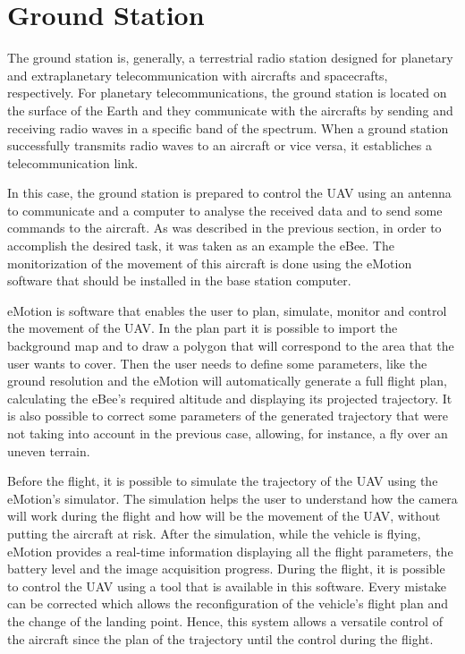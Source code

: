 \section{Ground Station}\label{sec:gs}

The ground station is, generally, a terrestrial radio station designed for planetary and extraplanetary telecommunication with aircrafts and spacecrafts, respectively. For planetary telecommunications, the ground station is located on the surface of the Earth and they communicate with the aircrafts by sending and receiving radio waves in a specific band of the spectrum. When a ground station successfully transmits radio waves to an aircraft or vice versa, it establiches a telecommunication link.

In this case, the ground station is prepared to control the UAV using an antenna to communicate and a computer to analyse the received data and to send some commands to the aircraft. As was described in the previous section, in order to accomplish the desired task, it was taken as an example the eBee. The monitorization of the movement of this aircraft is done using the eMotion software that should be installed in the base station computer.

eMotion is software that enables the user to plan, simulate, monitor and control the movement of the UAV. In the plan part it is possible to import the background map and to draw a polygon that will correspond to the area that the user wants to cover. Then the user needs to define some parameters, like the ground resolution and the eMotion will automatically generate a full flight plan, calculating the eBee’s required altitude and displaying its projected trajectory. It is also possible to correct some parameters of the generated trajectory that were not taking into account in the previous case, allowing, for instance, a fly over an uneven terrain.

Before the flight, it is possible to simulate the trajectory of the UAV using the eMotion's simulator. The simulation helps the user to understand how the camera will work during the flight and how will be the movement of the UAV, without putting the aircraft at risk. After the simulation, while the vehicle is flying, eMotion provides a real-time information displaying all the flight parameters, the battery level and the image acquisition progress. During the flight, it is possible to control the UAV using a tool that is available in this software. Every mistake can be corrected which allows the reconfiguration of the vehicle's flight plan and the change of the landing point. Hence, this system allows a versatile control of the aircraft since the plan of the trajectory until the control during the flight.